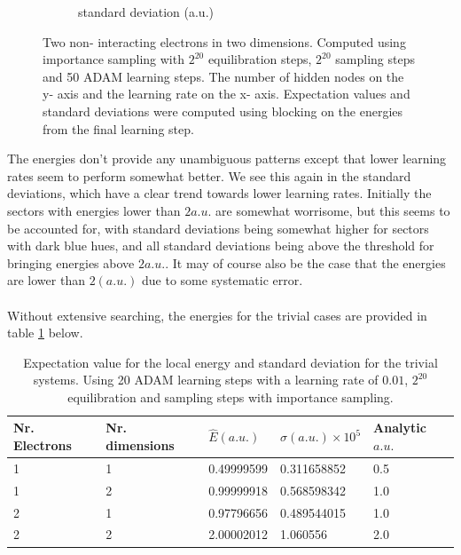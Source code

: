 \documentclass[11pt,a4paper,titlepage]{article}
\begin{document}
\begin{figure}[H]
\begin{subfigure}{.5\textwidth}
\caption{standard deviation (a.u.)}\label{J2}
\end{subfigure}
\caption[Parameter sweep for two non- interacting electrons]{Two non- interacting electrons in two dimensions. Computed using importance sampling with $2^{20}$ equilibration steps, $2^{20}$ sampling steps and 50 ADAM learning steps. The number of hidden nodes on the y- axis and the learning rate on the x- axis. Expectation values and standard deviations were computed using blocking on the energies from the final learning step.}
\label{fig:non_interacting_sweep}
\end{figure}
The energies don't provide any unambiguous patterns except that lower learning rates seem to perform somewhat better. We see this again in the standard deviations, which have a clear trend towards lower learning rates. Initially the sectors with energies lower than $2a.u.$ are somewhat worrisome, but this seems to be accounted for, with standard deviations being somewhat higher for sectors with dark blue hues, and all standard deviations being above the threshold for bringing energies above $2a.u.$. It may of course also be the case that the energies are lower than $2(a.u.)$ due to some systematic error.\\\\ Without extensive searching, the energies for the trivial cases are provided in table \ref{table1} below.
\begin{table}[H]
\caption[Reproducing analytical results for trivial cases]{Expectation value for the local energy and standard deviation for the trivial systems. Using 20 ADAM learning steps with a learning rate of $0.01$, $2^{20}$ equilibration and sampling steps with importance sampling.}
\centering
\begin{tabular}{|l|l|l|l|l|}
\hline
Nr. Electrons & Nr. dimensions & $\hat{E}(a.u.)$          & $\sigma (a.u.) \times 10^{5}$ & Analytic $a.u.$\\ \hline
1             & 1              & 0.49999599 & 0.311658852                  & 0.5\\ \hline
1             & 2              & 0.99999918 & 0.568598342                  & 1.0\\ \hline
2             & 1              & 0.97796656 & 0.489544015                  & 1.0\\ \hline
2             & 2              & 2.00002012  & 1.060556                  & 2.0\\ \hline
\end{tabular}
\label{table1}
\end{table}
\end{document}

